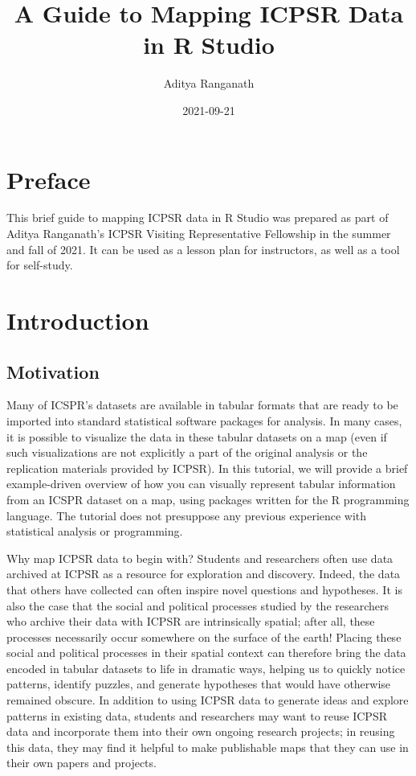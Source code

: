 \documentclass[
]{article}
\title{A Guide to Mapping ICPSR Data in R Studio}
\author{Aditya Ranganath}
\date{2021-09-21}
\begin{document}
\maketitle

{
\setcounter{tocdepth}{2}
\tableofcontents
}
\hypertarget{preface}{%
\section{Preface}\label{preface}}

This brief guide to mapping ICPSR data in R Studio was prepared as part of Aditya Ranganath's ICPSR Visiting Representative Fellowship in the summer and fall of 2021. It can be used as a lesson plan for instructors, as well as a tool for self-study.

\hypertarget{introduction}{%
\section{Introduction}\label{introduction}}

\hypertarget{motivation}{%
\subsection{Motivation}\label{motivation}}

Many of ICSPR's datasets are available in tabular formats that are ready to be imported into standard statistical software packages for analysis. In many cases, it is possible to visualize the data in these tabular datasets on a map (even if such visualizations are not explicitly a part of the original analysis or the replication materials provided by ICPSR). In this tutorial, we will provide a brief example-driven overview of how you can visually represent tabular information from an ICSPR dataset on a map, using packages written for the R programming language. The tutorial does not presuppose any previous experience with statistical analysis or programming.

Why map ICPSR data to begin with? Students and researchers often use data archived at ICPSR as a resource for exploration and discovery. Indeed, the data that others have collected can often inspire novel questions and hypotheses. It is also the case that the social and political processes studied by the researchers who archive their data with ICPSR are intrinsically spatial; after all, these processes necessarily occur somewhere on the surface of the earth! Placing these social and political processes in their spatial context can therefore bring the data encoded in tabular datasets to life in dramatic ways, helping us to quickly notice patterns, identify puzzles, and generate hypotheses that would have otherwise remained obscure. In addition to using ICPSR data to generate ideas and explore patterns in existing data, students and researchers may want to reuse ICPSR data and incorporate them into their own ongoing research projects; in reusing this data, they may find it helpful to make publishable maps that they can use in their own papers and projects.
\end{document}
